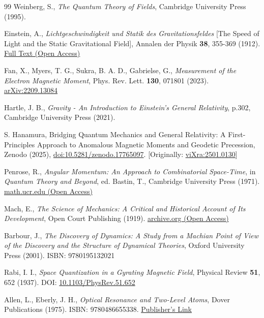 \documentclass[%
 reprint,
 amsmath,amssymb,
 aps,
]{revtex4-1}
\numberwithin{equation}{section}%
\begin{document}
\begin{thebibliography}{99}
 Weinberg, S., 
\textit{The Quantum Theory of Fields}, Cambridge University Press (1995).

 Einstein, A.,
\textit{Lichtgeschwindigkeit und Statik des Gravitationsfeldes} [The Speed of Light and the Static Gravitational Field],
Annalen der Physik \textbf{38}, 355-369 (1912). \href{http://myweb.rz.uni-augsburg.de/~eckern/adp/history/einstein-papers/1912_38_355-369.pdf}{Full Text (Open Access)}

 Fan, X., Myers, T. G., Sukra, B. A. D., Gabrielse, G., 
\textit{Measurement of the Electron Magnetic Moment}, 
Phys. Rev. Lett. \textbf{130}, 071801 (2023). \href{https://arxiv.org/abs/2209.13084}{arXiv:2209.13084}

 Hartle, J. B., 
\textit{Gravity - An Introduction to Einstein's General Relativity}, p.302, Cambridge University Press (2021).

S. Hanamura, Bridging Quantum Mechanics and General Relativity: A First-Principles Approach to Anomalous Magnetic Moments and Geodetic Precession, Zenodo (2025), \href{https://doi.org/10.5281/zenodo.17765097}{doi:10.5281/zenodo.17765097}. [Originally: \href{https://vixra.org/abs/2501.0130}{viXra:2501.0130}]

 Penrose, R., 
\textit{Angular Momentum: An Approach to Combinatorial Space-Time}, 
in \textit{Quantum Theory and Beyond}, ed. Bastin, T., Cambridge University Press (1971).  \href{https://math.ucr.edu/home/baez/penrose/Penrose-AngularMomentum.pdf}{math.ucr.edu (Open Access)}

 Mach, E., 
\textit{The Science of Mechanics: A Critical and Historical Account of Its Development}, 
Open Court Publishing (1919). \href{https://archive.org/details/scienceofmechani00machuoft}{archive.org  (Open Access)}

 Barbour, J., 
\textit{The Discovery of Dynamics: A Study from a Machian Point of View of the Discovery and the Structure of Dynamical Theories}, 
Oxford University Press (2001). ISBN: 9780195132021

 Rabi, I. I., 
\textit{Space Quantization in a Gyrating Magnetic Field},
Physical Review \textbf{51}, 652 (1937).
DOI: \href{https://doi.org/10.1103/PhysRev.51.652}{10.1103/PhysRev.51.652}

 Allen, L., Eberly, J. H.,
\textit{Optical Resonance and Two-Level Atoms},
Dover Publications (1975).
ISBN: 9780486655338.
\href{https://store.doverpublications.com/0486655334.html}{Publisher's Link}


\end{thebibliography}
\end{document}
